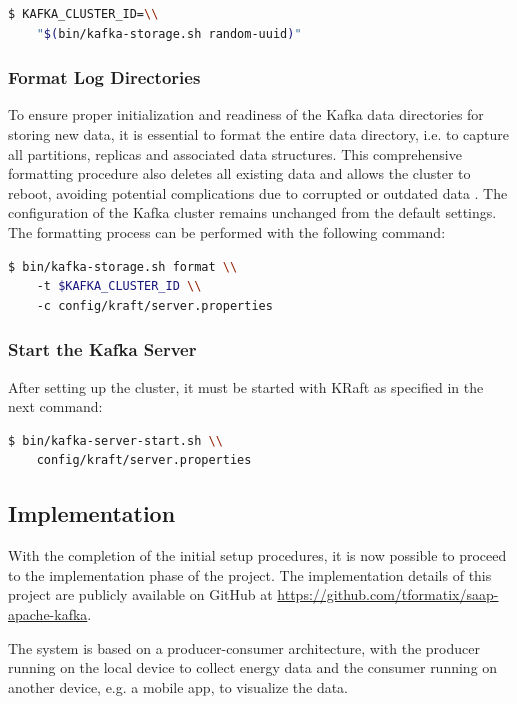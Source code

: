 \begin{lstlisting}[language=bash]
$ KAFKA_CLUSTER_ID=\\
    "$(bin/kafka-storage.sh random-uuid)"
\end{lstlisting}

\subsubsection{Format Log Directories} To ensure proper initialization and readiness of the Kafka data directories for storing new data, it is essential to format the entire data directory, i.e. to capture all partitions, replicas and associated data structures. This comprehensive formatting procedure also deletes all existing data and allows the cluster to reboot, avoiding potential complications due to corrupted or outdated data \cite{shapira2021kafka}. The configuration of the Kafka cluster remains unchanged from the default settings. The formatting process can be performed with the following command:

\begin{lstlisting}[language=bash]
$ bin/kafka-storage.sh format \\
    -t $KAFKA_CLUSTER_ID \\
    -c config/kraft/server.properties
\end{lstlisting}

\subsubsection{Start the Kafka Server} After setting up the cluster, it must be started with KRaft as specified in the next command:

\begin{lstlisting}[language=bash]
$ bin/kafka-server-start.sh \\
    config/kraft/server.properties
\end{lstlisting}

\subsection{Implementation}

With the completion of the initial setup procedures, it is now possible to proceed to the implementation phase of the project. The implementation details of this project are publicly available on GitHub at \url{https://github.com/tformatix/saap-apache-kafka}.

The system is based on a producer-consumer architecture, with the producer running on the local device to collect energy data and the consumer running on another device, e.g. a mobile app, to visualize the data.

